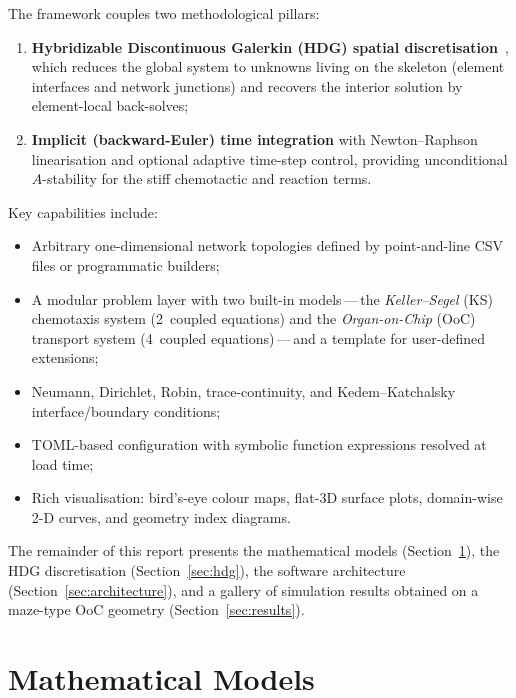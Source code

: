 \documentclass[11pt,a4paper]{article}
\begin{document}
The framework couples two methodological pillars:
\begin{enumerate}
  \item \textbf{Hybridizable Discontinuous Galerkin (HDG) spatial
        discretisation}~\cite{cockburn2009unified,cockburn2016static},
        which reduces the global system to unknowns living on the
        skeleton (element interfaces and network junctions) and
        recovers the interior solution by element-local back-solves;
  \item \textbf{Implicit (backward-Euler) time integration} with
        Newton--Raphson linearisation and optional adaptive
        time-step control, providing unconditional $A$-stability for
        the stiff chemotactic and reaction terms.
\end{enumerate}

Key capabilities include:
\begin{itemize}
  \item Arbitrary one-dimensional network topologies defined by
        point-and-line CSV files or programmatic builders;
  \item A modular problem layer with two built-in models\,---\,the
        \emph{Keller--Segel} (KS) chemotaxis system
        (2~coupled equations) and the \emph{Organ-on-Chip} (OoC) transport
        system (4~coupled equations)\,---\,and a template for user-defined
        extensions;
  \item Neumann, Dirichlet, Robin, trace-continuity, and
        Kedem--Katchalsky interface/boundary conditions;
  \item TOML-based configuration with symbolic function expressions
        resolved at load time;
  \item Rich visualisation: bird's-eye colour maps, flat-3D surface
        plots, domain-wise 2-D curves, and geometry index diagrams.
\end{itemize}

The remainder of this report presents the mathematical models
(Section~\ref{sec:models}), the HDG discretisation
(Section~\ref{sec:hdg}), the software architecture
(Section~\ref{sec:architecture}), and a gallery of simulation
results obtained on a maze-type OoC geometry
(Section~\ref{sec:results}).


\section{Mathematical Models}\label{sec:models}
\end{document}
